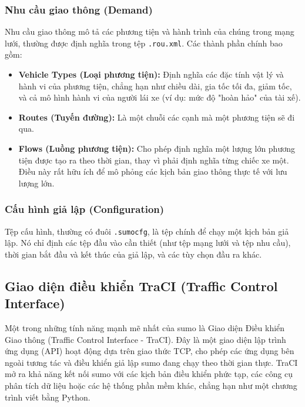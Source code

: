 \subsubsection{Nhu cầu giao thông (Demand)}
Nhu cầu giao thông mô tả các phương tiện và hành trình của chúng trong mạng lưới,
thường được định nghĩa trong tệp \texttt{.rou.xml}. Các thành phần chính bao gồm:
\begin{itemize}
    \item \textbf{Vehicle Types (Loại phương tiện):} Định nghĩa các đặc tính vật
        lý và hành vi của phương tiện, chẳng hạn như chiều dài, gia tốc tối đa, giảm
        tốc, và cả mô hình hành vi của người lái xe (ví dụ: mức độ "hoàn hảo"
        của tài xế).

    \item \textbf{Routes (Tuyến đường):} Là một chuỗi các cạnh mà một phương
        tiện sẽ đi qua.

    \item \textbf{Flows (Luồng phương tiện):} Cho phép định nghĩa một lượng lớn
        phương tiện được tạo ra theo thời gian, thay vì phải định nghĩa từng chiếc
        xe một. Điều này rất hữu ích để mô phỏng các kịch bản giao thông thực tế
        với lưu lượng lớn.
\end{itemize}

\subsubsection{Cấu hình giả lập (Configuration)}
Tệp cấu hình, thường có đuôi \texttt{.sumocfg}, là tệp chính để chạy một kịch
bản giả lập. Nó chỉ định các tệp đầu vào cần thiết (như tệp mạng lưới và tệp nhu
cầu), thời gian bắt đầu và kết thúc của giả lập, và các tùy chọn đầu ra khác.

\subsection{Giao diện điều khiển TraCI (Traffic Control Interface)}
Một trong những tính năng mạnh mẽ nhất của \ac{sumo} là Giao diện Điều khiển
Giao thông (Traffic Control Interface - TraCI). Đây là một giao diện lập trình ứng
dụng (API) hoạt động dựa trên giao thức TCP, cho phép các ứng dụng bên ngoài
tương tác và điều khiển giả lập \ac{sumo} đang chạy theo thời gian thực. TraCI
mở ra khả năng kết nối \ac{sumo} với các kịch bản điều khiển phức tạp, các công
cụ phân tích dữ liệu hoặc các hệ thống phần mềm khác, chẳng hạn như một chương trình
viết bằng Python.


